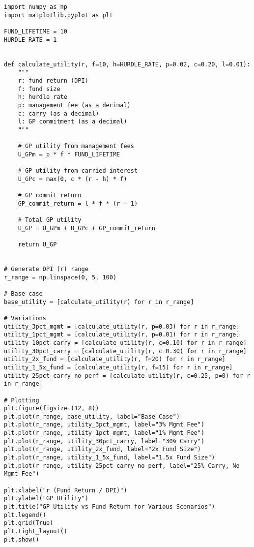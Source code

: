 \documentclass[a4paper, oneside]{discothesis}
\begin{document}
\begin{verbatim}
import numpy as np
import matplotlib.pyplot as plt

FUND_LIFETIME = 10
HURDLE_RATE = 1


def calculate_utility(r, f=10, h=HURDLE_RATE, p=0.02, c=0.20, l=0.01):
    """
    r: fund return (DPI)
    f: fund size
    h: hurdle rate
    p: management fee (as a decimal)
    c: carry (as a decimal)
    l: GP commitment (as a decimal)
    """

    # GP utility from management fees
    U_GPm = p * f * FUND_LIFETIME

    # GP utility from carried interest
    U_GPc = max(0, c * (r - h) * f)

    # GP commit return
    GP_commit_return = l * f * (r - 1)

    # Total GP utility
    U_GP = U_GPm + U_GPc + GP_commit_return

    return U_GP


# Generate DPI (r) range
r_range = np.linspace(0, 5, 100)

# Base case
base_utility = [calculate_utility(r) for r in r_range]

# Variations
utility_3pct_mgmt = [calculate_utility(r, p=0.03) for r in r_range]
utility_1pct_mgmt = [calculate_utility(r, p=0.01) for r in r_range]
utility_10pct_carry = [calculate_utility(r, c=0.10) for r in r_range]
utility_30pct_carry = [calculate_utility(r, c=0.30) for r in r_range]
utility_2x_fund = [calculate_utility(r, f=20) for r in r_range]
utility_1_5x_fund = [calculate_utility(r, f=15) for r in r_range]
utility_25pct_carry_no_perf = [calculate_utility(r, c=0.25, p=0) for r in r_range]

# Plotting
plt.figure(figsize=(12, 8))
plt.plot(r_range, base_utility, label="Base Case")
plt.plot(r_range, utility_3pct_mgmt, label="3% Mgmt Fee")
plt.plot(r_range, utility_1pct_mgmt, label="1% Mgmt Fee")
plt.plot(r_range, utility_30pct_carry, label="30% Carry")
plt.plot(r_range, utility_2x_fund, label="2x Fund Size")
plt.plot(r_range, utility_1_5x_fund, label="1.5x Fund Size")
plt.plot(r_range, utility_25pct_carry_no_perf, label="25% Carry, No Mgmt Fee")

plt.xlabel("r (Fund Return / DPI)")
plt.ylabel("GP Utility")
plt.title("GP Utility vs Fund Return for Various Scenarios")
plt.legend()
plt.grid(True)
plt.tight_layout()
plt.show()
    
\end{verbatim}
\end{document}
